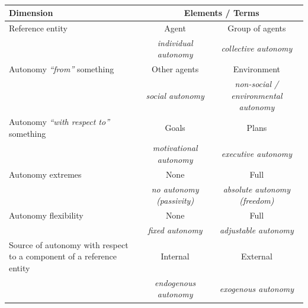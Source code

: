 \begin{table}
\centering
\def\arraystretch{1.4}%
\begin{tabularx}{\textwidth}{|p{}|X|X|X|X|}
\hline
\textbf{Dimension} & \multicolumn{4}{c|}{\textbf{Elements / Terms}}
\\\hline
Reference entity & \multicolumn{2}{c|}{Agent} & \multicolumn{2}{c|}{Group of agents}
\\\hline
& \multicolumn{2}{c|}{\emph{individual autonomy}} & \multicolumn{2}{c|}{\emph{collective autonomy}}
\\\hline\hline
Autonomy \emph{``from''} something & \multicolumn{2}{c|}{Other agents} & \multicolumn{2}{c|}{Environment}
\\\hline
& \multicolumn{2}{c|}{\emph{social autonomy}} & \multicolumn{2}{c|}{\emph{non-social / environmental autonomy}}
\\\hline\hline
Autonomy \emph{``with respect to''} something & \multicolumn{2}{c|}{Goals} & \multicolumn{2}{c|}{Plans}
\\\hline
& \multicolumn{2}{c|}{\emph{motivational autonomy}} & \multicolumn{2}{c|}{\emph{executive autonomy}}
\\\hline\hline
Autonomy extremes & \multicolumn{2}{c|}{None} & \multicolumn{2}{c|}{Full}
\\\hline
& \multicolumn{2}{c|}{\emph{no autonomy (passivity)}} & \multicolumn{2}{c|}{\emph{absolute autonomy (freedom)}}
\\\hline
Autonomy flexibility & \multicolumn{2}{c|}{None} & \multicolumn{2}{c|}{Full}
\\\hline
& \multicolumn{2}{c|}{\emph{fixed autonomy}} & \multicolumn{2}{c|}{\emph{adjustable autonomy}}
\\\hline
Source of autonomy with respect to a component of a reference entity & \multicolumn{2}{c|}{Internal} & \multicolumn{2}{c|}{External}
\\\hline
& \multicolumn{2}{c|}{\emph{endogenous autonomy}} & \multicolumn{2}{c|}{\emph{exogenous autonomy}}
\\\hline
\end{tabularx}
\caption{}
\label{table:autonomy-notions}
\end{table}

